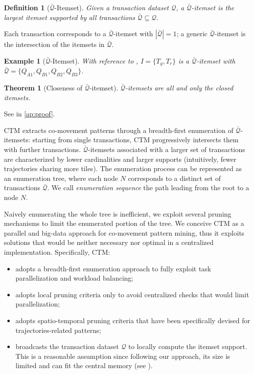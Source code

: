 \documentclass[
]{ceurart}
\newtheorem{theorem}{Theorem}
\newtheorem{example}{Example}
\newtheorem{definition}{Definition}
\begin{document}
\begin{definition}[$\bar{\mathcal{Q}}$-Itemset]
Given a transaction dataset $\mathcal{Q}$, a \textit{$\bar{\mathcal{Q}}$-itemset} is the largest itemset supported by all transactions $\bar{\mathcal{Q}} \subseteq \mathcal{Q}$.
\end{definition}
Each transaction corresponds to a $\bar{\mathcal{Q}}$-itemset with $|\bar{\mathcal{Q}}|=1$; a generic $\bar{\mathcal{Q}}$-itemset is the intersection of the itemsets in $\bar{\mathcal{Q}}$.
\begin{example}[$\bar{\mathcal{Q}}$-Itemset]
With reference to , $I = \{T_g,T_r\}$ is a $\bar{\mathcal{Q}}$-itemset with $\bar{\mathcal{Q}}=\{Q_{A1},Q_{B1},Q_{B2},Q_{B3}\}$.
\end{example}
\begin{theorem}[Closeness of $\bar{\mathcal{Q}}$-itemset]
$\bar{\mathcal{Q}}$-itemsets are all and only the closed itemsets.
\end{theorem}
See  in \ref{ap:proof}.

CTM extracts co-movement patterns through a breadth-first enumeration of $\bar{\mathcal{Q}}$-itemsets: starting from single transactions, CTM progressively intersects them with further transactions.
$\bar{\mathcal{Q}}$-itemsets associated with a larger set of transactions are characterized by lower cardinalities and larger supports (intuitively, fewer trajectories sharing more tiles).
The enumeration process can be represented as an enumeration tree, where each node $N$ corresponds to a distinct set of transactions $\bar{\mathcal{Q}}$.
We call \textit{enumeration sequence} the path leading from the root to a node $N$.

Naively enumerating the whole tree is inefficient, we exploit several pruning mechanisms to limit the enumerated portion of the tree.
We conceive CTM as a parallel and big-data approach for co-movement pattern mining, thus it exploits solutions that would be neither necessary nor optimal in a centralized implementation.
Specifically, CTM:
\begin{itemize}
\item adopts a breadth-first enumeration approach to fully exploit task parallelization and workload balancing;
\item adopts local pruning criteria only to avoid centralized checks that would limit parallelization;
\item adopts spatio-temporal pruning criteria that have been specifically devised for trajectories-related patterns;
\item broadcasts the transaction dataset $\mathcal{Q}$ to locally compute the itemset support.
This is a reasonable assumption since following our approach, its size is limited and can fit the central memory (see ).
\end{itemize}
\end{document}
